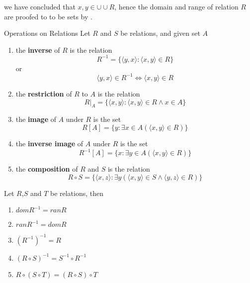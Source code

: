 \begin{remarks}
  we have concluded that $x, y \in \cup \cup R$, hence the domain and
  range of relation $R$ are proofed to to be sets by .
\end{remarks}

\begin{definition}{Operations on Relations}{}
  Let $R$ and $S$ be relations, and given set $A$
  \begin{enumerate}

    \item the \textbf{inverse} of $R$ is the relation
      \begin{equation*}
        R^{-1} = \{\langle y,x \rangle : \langle x,y \rangle \in R\}
      \end{equation*}
      or
      \begin{equation*}
        \langle y,x \rangle \in R^{-1} \iff \langle x,y \rangle \in R
      \end{equation*}
    \item the \textbf{restriction} of $R$ to $A$ is the relation
      \begin{equation*}
        R \vert_{A} = \{\langle x,y \rangle : \langle x,y \rangle \in
        R \land x \in A\}
      \end{equation*}
    \item the \textbf{image} of $A$ under $R$ is the set
      \begin{equation*}
        R[A] = \{y : \exists x \in A (\langle x,y \rangle \in R)\}
      \end{equation*}
    \item the \textbf{inverse image} of $A$ under $R$ is the set
      \begin{equation*}
        R^{-1}[A] = \{x : \exists y \in A(\langle x,y \rangle \in R)\}
      \end{equation*}
    \item the \textbf{composition} of $R$ and $S$ is the relation
      \begin{equation*}
        R \circ S = \{\langle x,z \rangle : \exists y (\langle x,y
        \rangle \in S \land \langle y,z \rangle \in R)\}
      \end{equation*}
  \end{enumerate}
\end{definition}

\begin{proposition}{}{}
  Let $R$,$S$ and $T$ be relations, then
  \begin{enumerate}

    \item $dom R^{-1} = ran R$
    \item $ran R^{-1} = dom R$
    \item $(R^{-1})^{-1} = R$
    \item $(R \circ S)^{-1} = S^{-1} \circ R^{-1}$
    \item $R \circ (S \circ T) = (R \circ S) \circ T$

  \end{enumerate}
\end{proposition}

